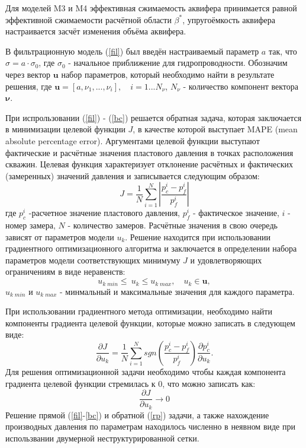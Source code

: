 \documentclass{article}
\begin{document}
Для моделей M3 и M4 эффективная сжимаемость аквифера принимается равной эффективной сжимаемости расчётной области $\beta^*$, упругоёмкость аквифера настраивается засчёт изменения объёма аквифера.

В фильтрационную модель (\ref{fil}) был введён настраиваемый параметр $a$ так, что $\sigma = a\cdot\sigma_0$, где $\sigma_0$ - начальное приближение для гидропроводности. Обозначим через вектор $\boldsymbol{u}$ набор параметров, который необходимо найти в результате решения, где $\boldsymbol{u} = [a, \nu_{1},...,\nu_{i}],\quad i = 1...N_{\nu}$, $N_{\nu}$ - количество компонент вектора $\boldsymbol{\nu}$.

При испрользовании (\ref{fil}) - (\ref{bc}) решается обратная задача, которая заключается в  минимизации целевой функции $J$, в качестве которой выступает MAPE (mean absolute percentage error). Аргументами целевой функции выступают фактические и расчётные значения пластового давления в точках расположения скважин. Целевая функция характеризует отклонение расчётных и фактических (замеренных) значений давления и записывается следующим образом:
\begin{equation} \label{mape}
J=\frac{1}{N}\sum_{i=1}^N{\left\vert\frac{p_c^i-p_f^i}{p_f^i}\right\vert}
\end{equation}
где $p_c^i$ -расчетное значение пластового давления, $p_f^i$ - фактическое значение, $i$ - номер замера, $N$ - количество замеров. Расчётные значения в свою очередь зависят от параметров модели $u_k$. Решение находится при использовании градиентного оптимизационного алгоритма и заключается в определении набора параметров модели соответствующих минимуму $J$ и удовлетворяющих ограничениям в виде неравенств:
\begin{equation*}
u_{k\;min}\leq\ u_k\leq u_{k\;max}, \quad u_k \in \boldsymbol{u},
\end{equation*}
$u_{k\;min}$ и $u_{k\;max}$ - минмальный и максимальные значения для каждого параметра.

При использовании градиентного метода оптимизации, необходимо найти компоненты градиента целевой функции, которые можно записать в следующем виде:
\begin{equation}
\frac{\partial J}{\partial u_k} = \frac{1}{N}\sum_{i=1}^N sgn\left(\frac{p_c^i-p_f^i}{p_f^i}\right)\frac{\partial p_c^i}{\partial u_k}.
\end{equation}
Для решения оптимизационной задачи необходимо чтобы каждая компонента градиента целевой функции стремилась к 0, что можно записать как:
\begin{equation} \label{rp}
	 \frac{\partial J}{\partial u_k} \rightarrow 0
\end{equation}
Решение прямой (\ref{fil}-\ref{bc}) и обратной (\ref{rp}) задачи, а также нахождение производных давления по параметрам находилось численно \cite{opt} в неявном виде при использвании двумерной неструктурированной сетки.
\end{document}
